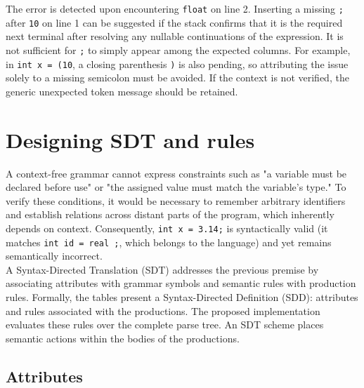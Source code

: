 \documentclass[12pt,letterpaper]{article}
\begin{document}
The error is detected upon encountering \texttt{float} on line 2. Inserting a missing \texttt{;} after \texttt{10} on line 1 can be suggested if the stack confirms that it is the required next terminal after resolving any nullable continuations of the expression. It is not sufficient for \texttt{;} to simply appear among the expected columns. For example, in \texttt{int x = (10}, a closing parenthesis \texttt{)} is also pending, so attributing the issue solely to a missing semicolon must be avoided. If the context is not verified, the generic unexpected token message should be retained.

\section{Designing SDT and rules}
A context-free grammar cannot express constraints such as "a variable must be declared before use" or "the assigned value must match the variable's type." To verify these conditions, it would be necessary to remember arbitrary identifiers and establish relations across distant parts of the program, which inherently depends on context. Consequently, \texttt{int x = 3.14;} is syntactically valid (it matches \texttt{int id = real ;}, which belongs to the language) and yet remains semantically incorrect.\\

A Syntax-Directed Translation (SDT) addresses the previous premise by associating attributes with grammar symbols and semantic rules with production rules. Formally, the tables present a Syntax-Directed Definition (SDD): attributes and rules associated with the productions. The proposed implementation evaluates these rules over the complete parse tree. An SDT scheme places semantic actions within the bodies of the productions.
\subsection{Attributes}
\end{document}
